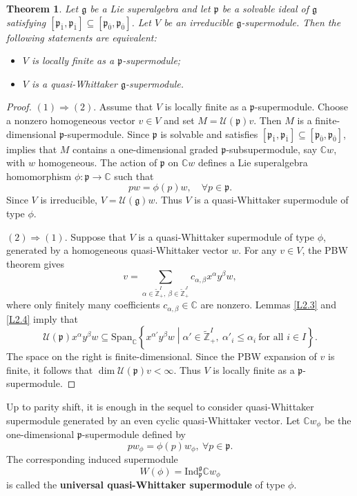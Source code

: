 \documentclass[12pt,reqno]{article}
\newtheorem{thm}{Theorem}[section]
\def\o{\overline}
\def\a{\alpha}
\def\b{\beta}
\def\F{\mathfrak}
\def\r{\mathrm}
\def\C{\mathcal}
\def\CC{\mathbb{C}}
\def\ZZ{\mathbb{Z}}
\def\beqn{\begin{equation*}}
\def\eeqn{\end{equation*}}
\def\beq{\begin{equation}}
\def\eeq{\end{equation}}
\begin{document}
\begin{thm}
Let $\F{g}$ be a Lie superalgebra and let $\F{p}$ be a solvable ideal of $\F{g}$ satisfying
$[\F{p}_{\o{1}},\F{p}_{\o{1}}]\subseteq[\F{p}_{\o{0}},\F{p}_{\o{0}}]$. Let $V$ be an irreducible $\F{g}$-supermodule. Then the following statements are equivalent:
\begin{itemize}
	\item[(1)] $V$ is locally finite as a $\F{p}$-supermodule;
	\item[(2)] $V$ is a quasi-Whittaker $\F{g}$-supermodule.
\end{itemize}
\end{thm}

\begin{proof}
$(1)\Rightarrow(2)$. Assume that $V$ is locally finite as a $\F{p}$-supermodule. Choose a nonzero homogeneous vector $v\in V$ and set $M=\C{U}(\F{p})v$. Then $M$ is a finite-dimensional $\F{p}$-supermodule. Since $\F{p}$ is solvable and satisfies $[\F{p}_{\o{1}},\F{p}_{\o{1}}]\subseteq[\F{p}_{\o{0}},\F{p}_{\o{0}}]$, \cite[Lemma 1.37]{CW} implies that $M$ contains a one-dimensional graded $\F{p}$-subsupermodule, say $\CC w$, with $w$ homogeneous. The action of $\F{p}$ on $\CC w$ defines a Lie superalgebra homomorphism $\phi\colon\F{p}\rightarrow\CC$ such that
\beqn
pw=\phi(p)w,\quad \forall p\in\F{p}.
\eeqn
Since $V$ is irreducible, $V=\C{U}(\F{g})w$. Thus $V$ is a quasi-Whittaker supermodule of type $\phi$.

$(2)\Rightarrow(1)$. Suppose that $V$ is a quasi-Whittaker supermodule of type $\phi$, generated by a homogeneous quasi-Whittaker vector $w$. For any $v\in V$, the PBW theorem gives
\beqn
v=\sum_{\a\in\widetilde{\ZZ}_{+}^{I},~\b\in\widetilde{\ZZ}_{+}^{J}}
c_{\a,\b}x^\a y^\b w,
\eeqn
where only finitely many coefficients $c_{\a,\b}\in\CC$ are nonzero. Lemmas \ref{L2.3} and \ref{L2.4} imply that
\beqn
\C{U}(\F{p})x^\a y^\b w
\subseteq\r{Span}_{\CC}\left\{x^{\a'}y^\b w\middle|
\a'\in\widetilde{\ZZ}_+^I,~\a'_i\leq\a_i~\text{for all }i\in I\right\}.
\eeqn
The space on the right is finite-dimensional. Since the PBW expansion of $v$ is finite, it follows that $\dim\C{U}(\F{p})v<\infty$. Thus $V$ is locally finite as a $\F{p}$-supermodule.
\end{proof}


Up to parity shift, it is enough in the sequel to consider quasi-Whittaker supermodule generated by an even cyclic quasi-Whittaker vector.
Let $\CC w_{\phi}$ be the one-dimensional $\F{p}$-supermodule defined by 
\beq
pw_{\phi}=\phi(p)w_{\phi}, ~\forall p\in\F{p}.
\eeq
The corresponding induced supermodule
\beq
W(\phi)=\r{Ind}_{\F{p}}^{\F{g}}\CC w_{\phi}
\eeq
is called the {\bf universal quasi-Whittaker supermodule} of type $\phi$. 
\end{document}
